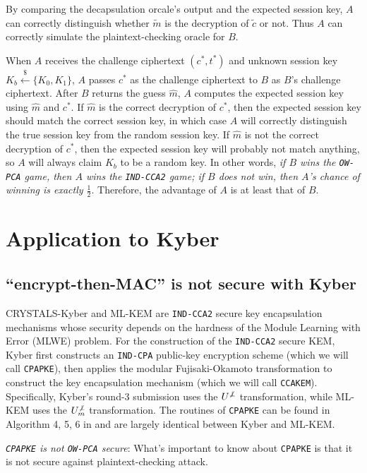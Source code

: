 \documentclass[floatrow,journal=tches,submission]{iacrtrans}
\newcommand{\monospace}{\texttt}
\newcommand{\leftsample}{\stackrel{\$}{\leftarrow}}
\begin{document}
By comparing the decapsulation orcale's output and the expected session key, $A$ can correctly distinguish whether $\tilde{m}$ is the decryption of $\tilde{c}$ or not. Thus $A$ can correctly simulate the plaintext-checking oracle for $B$.

When $A$ receives the challenge ciphertext $(c^\ast, t^\ast)$ and unknown session key $K_b \leftsample \{K_0, K_1\}$, $A$ passes $c^\ast$ as the challenge ciphertext to $B$ as $B$'s challenge ciphertext. After $B$ returns the guess $\hat{m}$, $A$ computes the expected session key using $\hat{m}$ and $c^\ast$. If $\hat{m}$ is the correct decryption of $c^\ast$, then the expected session key should match the correct session key, in which case $A$ will correctly distinguish the true session key from the random session key. If $\hat{m}$ is not the correct decryption of $c^\ast$, then the expected session key will probably not match anything, so $A$ will always claim $K_b$ to be a random key. In other words, \emph{if $B$ wins the \monospace{OW-PCA} game, then $A$ wins the \monospace{IND-CCA2} game; if $B$ does not win, then $A$'s chance of winning is exactly $\frac{1}{2}$}. Therefore, the advantage of $A$ is at least that of $B$.

\section{Application to Kyber}
\subsection{``encrypt-then-MAC'' is not secure with Kyber}
CRYSTALS-Kyber \cite{bos2018crystals}\cite{avanzi2019crystals} and ML-KEM \cite{key2023mechanism} are \monospace{IND-CCA2} secure key encapsulation mechanisms whose security depends on the hardness of the Module Learning with Error (MLWE) problem. For the construction of the \monospace{IND-CCA2} secure KEM, Kyber first constructs an \monospace{IND-CPA} public-key encryption scheme (which we will call \monospace{CPAPKE}), then applies the modular Fujisaki-Okamoto transformation \cite{hofheinz2017modular} to construct the key encapsulation mechanism (which we will call \monospace{CCAKEM}). Specifically, Kyber's round-3 submission uses the $U^{\not\bot}$ transformation, while ML-KEM uses the $U^{\not\bot}_m$ transformation. The routines of \monospace{CPAPKE} can be found in Algorithm 4, 5, 6 in \cite{avanzi2019crystals} and are largely identical between Kyber and ML-KEM. 

\emph{\monospace{CPAPKE} is not \monospace{OW-PCA} secure}: What's important to know about \monospace{CPAPKE} is that it is not secure against plaintext-checking attack.
\end{document}
